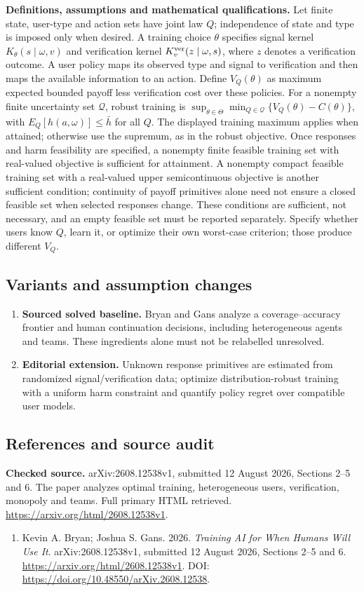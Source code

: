 \documentclass[11pt,a4paper]{article}
\begin{document}
\textbf{Definitions, assumptions and mathematical qualifications.} Let finite state, user-type and action sets have joint law \(Q\); independence of state and type is imposed only when desired. A training choice \(\theta\) specifies signal kernel \(K_\theta(s\mid\omega,v)\) and verification kernel \(K_v^{\rm ver}(z\mid\omega,s)\), where \(z\) denotes a verification outcome. A user policy maps its observed type and signal to verification and then maps the available information to an action. Define \(V_Q(\theta)\) as maximum expected bounded payoff less verification cost over these policies. For a nonempty finite uncertainty set \(\mathcal Q\), robust training is \(\sup_{\theta\in\Theta}\min_{Q\in\mathcal Q}\{V_Q(\theta)-C(\theta)\}\), with \(E_Q[h(a,\omega)]\leq\bar h\) for all \(Q\). The displayed training maximum applies when attained; otherwise use the supremum, as in the robust objective. Once responses and harm feasibility are specified, a nonempty finite feasible training set with real-valued objective is sufficient for attainment. A nonempty compact feasible training set with a real-valued upper semicontinuous objective is another sufficient condition; continuity of payoff primitives alone need not ensure a closed feasible set when selected responses change. These conditions are sufficient, not necessary, and an empty feasible set must be reported separately. Specify whether users know \(Q\), learn it, or optimize their own worst-case criterion; those produce different \(V_Q\).
\subsection*{Variants and assumption changes}
\begin{enumerate}
\item \textbf{Sourced solved baseline.} Bryan and Gans analyze a coverage--accuracy frontier and human continuation decisions, including heterogeneous agents and teams. These ingredients alone must not be relabelled unresolved.
\item \textbf{Editorial extension.} Unknown response primitives are estimated from randomized signal/verification data; optimize distribution-robust training with a uniform harm constraint and quantify policy regret over compatible user models.
\end{enumerate}
\subsection*{References and source audit}
\textbf{Checked source.} arXiv:2608.12538v1, submitted 12 August 2026, Sections 2--5 and 6. The paper analyzes optimal training, heterogeneous users, verification, monopoly and teams. Full primary HTML retrieved. \url{https://arxiv.org/html/2608.12538v1}.
\begin{enumerate}\raggedright
\item\hypertarget{definitions:source:30007700:1}{} Kevin A. Bryan; Joshua S. Gans. 2026. \emph{Training AI for When Humans Will Use It}. arXiv:2608.12538v1, submitted 12 August 2026, Sections 2--5 and 6.
\url{https://arxiv.org/html/2608.12538v1}.
DOI: \url{https://doi.org/10.48550/arXiv.2608.12538}.
\end{enumerate}
\end{document}
